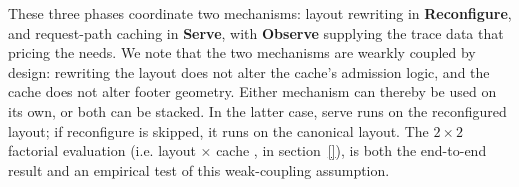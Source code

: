 These three phases coordinate two mechanisms: layout rewriting in \textbf{Reconfigure}, and request-path caching in \textbf{Serve}, with \textbf{Observe} supplying the trace data that pricing the needs. We note that the two mechanisms are wearkly coupled by design: rewriting the layout does not alter the cache's admission logic, and the cache does not alter footer geometry. Either mechanism can thereby be used on its own, or both can be stacked. In the latter case, serve runs on the reconfigured layout; if reconfigure is skipped, it runs on the canonical layout. The $2\times2$ factorial evaluation (i.e. layout%
$\times$ cache%
, in section~\ref{}), is both the end-to-end result and an empirical test of this weak-coupling assumption.%
